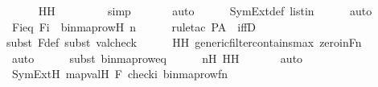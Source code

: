 \begin{isabellebody}
\ \ \ \ \isamarkupfalse%
\ HH\ \isanewline
\ \ \ \ \ \ \isamarkupfalse%
\ simp\isanewline
\ \ \ \ \ \isamarkupfalse%
\ auto{\isacharbrackleft}{\kern0pt}{}{\isacharbrackright}{\kern0pt}\isanewline
\ \ \ \ \isamarkupfalse%
\ SymExt{\isacharunderscore}{\kern0pt}def\ listin{\isacharprime}{\kern0pt}{\isacharprime}{\kern0pt}\isanewline
\ \ \ \ \isamarkupfalse%
\ auto\isanewline
\ \ \isamarkupfalse%
\ \isamarkupfalse%
\ Fieq{}{\isacharcolon}{\kern0pt}\ {\isachardoublequoteopen}F{\isacharbackquote}{\kern0pt}i\ {\isacharequal}{\kern0pt}\ binmap{\isacharunderscore}{\kern0pt}row{\isacharparenleft}{\kern0pt}H{\isacharcomma}{\kern0pt}\ n{\isacharparenright}{\kern0pt}{\isachardoublequoteclose}\ \isanewline
\ \ \ \ \isamarkupfalse%
{\isacharparenleft}{\kern0pt}rule{\isacharunderscore}{\kern0pt}tac\ P{\isacharequal}{\kern0pt}{\isachardoublequoteopen}{\isacharquery}{\kern0pt}A{\isachardoublequoteclose}\ \ iffD{}{\isacharparenright}{\kern0pt}\isanewline
\ \ \ \ \ \isamarkupfalse%
{\isacharparenleft}{\kern0pt}subst\ F{\isacharunderscore}{\kern0pt}def{\isacharcomma}{\kern0pt}\ subst\ valcheck{\isacharparenright}{\kern0pt}\isanewline
\ \ \ \ \isamarkupfalse%
\ HH\ generic{\isacharunderscore}{\kern0pt}filter{\isacharunderscore}{\kern0pt}contains{\isacharunderscore}{\kern0pt}max\ zero{\isacharunderscore}{\kern0pt}in{\isacharunderscore}{\kern0pt}Fn\isanewline
\ \ \ \ \ \ \ \isamarkupfalse%
\ auto{\isacharbrackleft}{\kern0pt}{}{\isacharbrackright}{\kern0pt}\isanewline
\ \ \ \ \ \isamarkupfalse%
{\isacharparenleft}{\kern0pt}subst\ binmap{\isacharunderscore}{\kern0pt}row{\isacharunderscore}{\kern0pt}eq{\isacharparenright}{\kern0pt}\isanewline
\ \ \ \ \isamarkupfalse%
\ nH\ HH\ \isanewline
\ \ \ \ \isamarkupfalse%
\ auto\isanewline
\isanewline
\ \ \isamarkupfalse%
\ {\isachardoublequoteopen}SymExt{\isacharparenleft}{\kern0pt}H{\isacharparenright}{\kern0pt}{\isacharcomma}{\kern0pt}\ map{\isacharparenleft}{\kern0pt}val{\isacharparenleft}{\kern0pt}H{\isacharparenright}{\kern0pt}{\isacharcomma}{\kern0pt}\ {\isacharbrackleft}{\kern0pt}F{\isacharprime}{\kern0pt}{\isacharcomma}{\kern0pt}\ check{\isacharparenleft}{\kern0pt}i{\isacharparenright}{\kern0pt}{\isacharcomma}{\kern0pt}\ binmap{\isacharunderscore}{\kern0pt}row{\isacharprime}{\kern0pt}{\isacharparenleft}{\kern0pt}f{\isacharbackquote}{\kern0pt}n{\isacharparenright}{\kern0pt}{\isacharbrackright}{\kern0pt}{\isacharparenright}{\kern0pt}\ {\isasymTurnstile}\ {\isasymphi}{\isachardoublequoteclose}\isanewline

\end{isabellebody}
